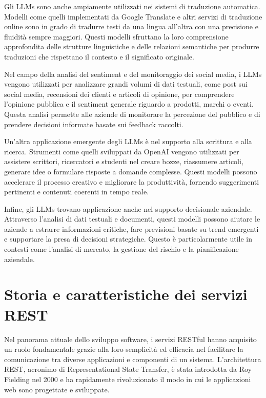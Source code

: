 \documentclass[a4paper,twoside,12pt]{toptesi}
\begin{document}
Gli LLMs sono anche ampiamente utilizzati nei sistemi di traduzione automatica. Modelli come quelli implementati da Google Translate e altri servizi di traduzione online sono in grado di tradurre testi da una lingua all'altra con una precisione e fluidità sempre maggiori. Questi modelli sfruttano la loro comprensione approfondita delle strutture linguistiche e delle relazioni semantiche per produrre traduzioni che rispettano il contesto e il significato originale.

Nel campo della analisi del sentiment e del monitoraggio dei social media, i LLMs vengono utilizzati per analizzare grandi volumi di dati testuali, come post sui social media, recensioni dei clienti e articoli di opinione, per comprendere l'opinione pubblica e il sentiment generale riguardo a prodotti, marchi o eventi. Questa analisi permette alle aziende di monitorare la percezione del pubblico e di prendere decisioni informate basate sui feedback raccolti.

Un'altra applicazione emergente degli LLMs è nel supporto alla scrittura e alla ricerca. Strumenti come quelli sviluppati da OpenAI vengono utilizzati per assistere scrittori, ricercatori e studenti nel creare bozze, riassumere articoli, generare idee o formulare risposte a domande complesse. Questi modelli possono accelerare il processo creativo e migliorare la produttività, fornendo suggerimenti pertinenti e contenuti coerenti in tempo reale.

Infine, gli LLMs trovano applicazione anche nel supporto decisionale aziendale. Attraverso l'analisi di dati testuali e documenti, questi modelli possono aiutare le aziende a estrarre informazioni critiche, fare previsioni basate su trend emergenti e supportare la presa di decisioni strategiche. Questo è particolarmente utile in contesti come l'analisi di mercato, la gestione del rischio e la pianificazione aziendale.


\section{Storia e caratteristiche dei servizi REST}

Nel panorama attuale dello sviluppo software, i servizi RESTful hanno acquisito un ruolo fondamentale grazie alla loro semplicità ed efficacia nel facilitare la comunicazione tra diverse applicazioni e componenti di un sistema. L'architettura REST, acronimo di Representational State Transfer, è stata introdotta da Roy Fielding nel 2000 e ha rapidamente rivoluzionato il modo in cui le applicazioni web sono progettate e sviluppate.
\end{document}
